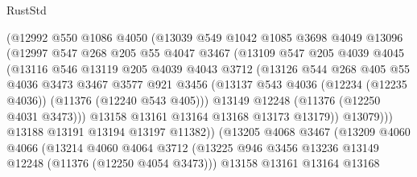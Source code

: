 \begin{lexlean}{RustStd}
\begin{coremodule}
{\begin{coremodule}
{{{{{{{{{{{{{{{{{{{{{{{{{{{{{{{{{{{{{{{{{{{{{{{{{{{{{{{{{{{{{{{{{{{{{{{{{{{{{{{{{{{{{                    (@12992
                      @550
                      @1086
                      @4050
                      (@13039
                        @549
                        @1042
                        @1085
                        @3698
                        @4049
                        @13096
                        (@12997
                          @547
                          @268
                          @205
                          @55
                          @4047
                          @3467
                          (@13109
                            @547
                            @205
                            @4039
                            @4045
                            (@13116
                              @546
                              @13119
                              @205
                              @4039
                              @4043
                              @3712
                              (@13126
                                @544
                                @268
                                @405
                                @55
                                @4036
                                @3473
                                @3467
                                @3577
                                @921
                                @3456
                                (@13137
                                  @543
                                  @4036
                                  (@12234 (@12235 @4036))
                                  (@11376 (@12240 @543 @405)))
                                @13149
                                @12248
                                (@11376 (@12250 @4031 @3473)))
                              @13158
                              @13161
                              @13164
                              @13168
                              @13173
                              @13179))
                          @13079)))
                    @13188
                    @13191
                    @13194
                    @13197
                    @11382))
                (@13205
                  @4068
                  @3467
                  (@13209
                    @4060
                    @4066
                    (@13214
                      @4060
                      @4064
                      @3712
                      (@13225 @946 @3456 @13236 @13149 @12248 (@11376 (@12250 @4054 @3473)))
                      @13158
                      @13161
                      @13164
                      @13168
}}}}}}}}}}}}}}}}}}}}}}}}}}}}}}}}}}}}}}}}}}}}}}}}}}}}}}}}}}}}}}}}}}}}}}}}}}}}}}}}}}}}}
\end{coremodule}}
\end{coremodule}
\end{lexlean}
